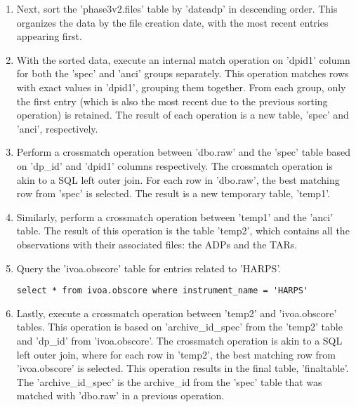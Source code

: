 \documentclass[a4paper,12pt]{article}
\begin{document}
\begin{enumerate}
\item 
    Next, sort the 'phase3v2.files' table by 'dateadp' in descending order. This organizes the data by the file creation date, with the most recent entries appearing first.

\item 
    With the sorted data, execute an internal match operation on 'dpid1' column for both the 'spec' and 'anci' groups separately. 
This operation matches rows with exact values in 'dpid1', grouping them together. 
From each group, only the first entry (which is also the most recent due to the previous sorting operation) is retained. 
The result of each operation is a new table, 'spec' and 'anci', respectively.

\item 
    Perform a crossmatch operation between 'dbo.raw' and the 'spec' table based on 'dp\_id' and 'dpid1' columns respectively. 
The crossmatch operation is akin to a SQL left outer join. For each row in 'dbo.raw', the best matching row from 'spec' is selected. 
The result is a new temporary table, 'temp1'.

\item 
    Similarly, perform a crossmatch operation between 'temp1' and the 'anci' table. 
The result of this operation is the table 'temp2', which contains all the observations with their associated files: the ADPs and the TARs.

\item 
    Query the 'ivoa.obscore' table for entries related to 'HARPS'.
\begin{verbatim}
select * from ivoa.obscore where instrument_name = 'HARPS'
\end{verbatim}

\item 
    Lastly, execute a crossmatch operation between 'temp2' and 'ivoa.obscore' tables. 
This operation is based on 'archive\_id\_spec' from the 'temp2' table and 'dp\_id' from 'ivoa.obscore'. 
The crossmatch operation is akin to a SQL left outer join, where for each row in 'temp2', the best matching row from 'ivoa.obscore' is selected. 
This operation results in the final table, 'finaltable'. The 'archive\_id\_spec' is the archive\_id from the 'spec' table that was matched with 'dbo.raw' in a previous operation.

\end{enumerate}
\end{document}
